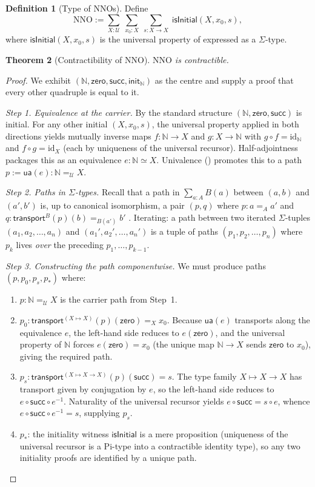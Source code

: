\documentclass[12pt]{article}
\newtheorem{theorem}{Theorem}[section]
\theoremstyle{definition}
\newtheorem{definition}[theorem]{Definition}
\theoremstyle{remark}
\newcommand{\U}{\mathcal{U}}
\newcommand{\N}{\mathbb{N}}
\newcommand{\zero}{\mathsf{zero}}
\newcommand{\suc}{\mathsf{succ}}
\newcommand{\transport}{\mathsf{transport}}
\newcommand{\ua}{\mathsf{ua}}
\newcommand{\eqv}{\simeq}
\begin{document}
\begin{definition}[Type of NNOs]
\label{def:nno-type}
Define
\[
\mathrm{NNO} := \sum_{X : \U}\;\sum_{x_0 : X}\;\sum_{s : X \to X}\;
\mathsf{isInitial}(X, x_0, s),
\]
where $\mathsf{isInitial}(X, x_0, s)$ is the universal property of
 expressed as a $\Sigma$-type.
\end{definition}

\begin{theorem}[Contractibility of NNO]
\label{thm:nno-contractible}
$\mathrm{NNO}$ is contractible.
\end{theorem}

\begin{proof}
We exhibit $(\N, \zero, \suc, \mathsf{init}_\N)$ as the centre and supply
a proof that every other quadruple is equal to it.

\emph{Step 1. Equivalence at the carrier.}
By  the standard structure $(\N, \zero, \suc)$ is initial.
For any other initial $(X, x_0, s)$, the universal property applied in
both directions yields mutually inverse maps $f : \N \to X$ and
$g : X \to \N$ with $g \circ f = \mathrm{id}_\N$ and
$f \circ g = \mathrm{id}_X$ (each by uniqueness of the universal
recursor). Half-adjointness packages this as an equivalence
$e : \N \eqv X$. Univalence () promotes this to a
path $p := \ua(e) : \N =_\U X$.

\emph{Step 2. Paths in $\Sigma$-types.}
Recall that a path in $\sum_{a : A} B(a)$ between $(a, b)$ and
$(a', b')$ is, up to canonical isomorphism, a pair $(p, q)$ where
$p : a =_A a'$ and $q : \transport^B(p)(b) =_{B(a')} b'$
\cite[Theorem~2.7.2]{HoTTBook}. Iterating: a path between two iterated
$\Sigma$-tuples
$(a_1, a_2, \ldots, a_n)$ and $(a_1', a_2', \ldots, a_n')$ is a tuple of
paths $(p_1, p_2, \ldots, p_n)$ where $p_k$ lives \emph{over} the
preceding $p_1, \ldots, p_{k-1}$.

\emph{Step 3. Constructing the path componentwise.}
We must produce paths $(p, p_0, p_s, p_*)$ where:
\begin{enumerate}
\item $p : \N =_\U X$ is the carrier path from Step~1.
\item $p_0 : \transport^{(X \mapsto X)}(p)(\zero) =_X x_0$. Because
$\ua(e)$ transports along the equivalence $e$, the left-hand side
reduces to $e(\zero)$, and the universal property of $\N$ forces
$e(\zero) = x_0$ (the unique map $\N \to X$ sends $\zero$ to $x_0$),
giving the required path.
\item $p_s : \transport^{(X \mapsto X \to X)}(p)(\suc) = s$.
The type family $X \mapsto X \to X$ has transport given by conjugation
by $e$, so the left-hand side reduces to $e \circ \suc \circ e^{-1}$.
Naturality of the universal recursor yields $e \circ \suc = s \circ e$,
whence $e \circ \suc \circ e^{-1} = s$, supplying $p_s$.
\item $p_*$: the initiality witness $\mathsf{isInitial}$ is a mere
proposition (uniqueness of the universal recursor is a Pi-type into a
contractible identity type), so any two initiality proofs are
identified by a unique path.
\end{enumerate}


\end{proof}
\end{document}
